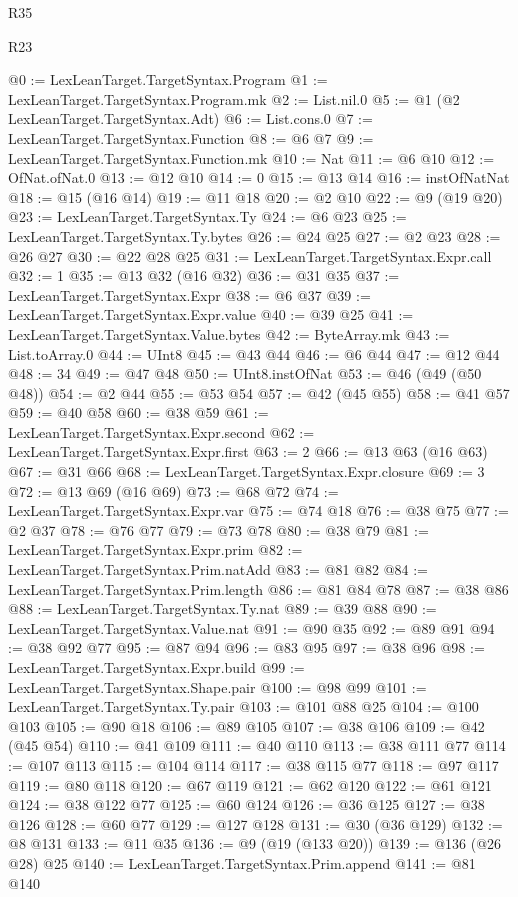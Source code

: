 \begin{lexlean}{R35}
\begin{lexlean}{R23}
\begin{coremodule}
{{{{{{{{{{{{{{{{{{{{{@0 := LexLeanTarget.TargetSyntax.Program
@1 := LexLeanTarget.TargetSyntax.Program.mk
@2 := List.nil.{0}
@5 := @1 (@2 LexLeanTarget.TargetSyntax.Adt)
@6 := List.cons.{0}
@7 := LexLeanTarget.TargetSyntax.Function
@8 := @6 @7
@9 := LexLeanTarget.TargetSyntax.Function.mk
@10 := Nat
@11 := @6 @10
@12 := OfNat.ofNat.{0}
@13 := @12 @10
@14 := 0
@15 := @13 @14
@16 := instOfNatNat
@18 := @15 (@16 @14)
@19 := @11 @18
@20 := @2 @10
@22 := @9 (@19 @20)
@23 := LexLeanTarget.TargetSyntax.Ty
@24 := @6 @23
@25 := LexLeanTarget.TargetSyntax.Ty.bytes
@26 := @24 @25
@27 := @2 @23
@28 := @26 @27
@30 := @22 @28 @25
@31 := LexLeanTarget.TargetSyntax.Expr.call
@32 := 1
@35 := @13 @32 (@16 @32)
@36 := @31 @35
@37 := LexLeanTarget.TargetSyntax.Expr
@38 := @6 @37
@39 := LexLeanTarget.TargetSyntax.Expr.value
@40 := @39 @25
@41 := LexLeanTarget.TargetSyntax.Value.bytes
@42 := ByteArray.mk
@43 := List.toArray.{0}
@44 := UInt8
@45 := @43 @44
@46 := @6 @44
@47 := @12 @44
@48 := 34
@49 := @47 @48
@50 := UInt8.instOfNat
@53 := @46 (@49 (@50 @48))
@54 := @2 @44
@55 := @53 @54
@57 := @42 (@45 @55)
@58 := @41 @57
@59 := @40 @58
@60 := @38 @59
@61 := LexLeanTarget.TargetSyntax.Expr.second
@62 := LexLeanTarget.TargetSyntax.Expr.first
@63 := 2
@66 := @13 @63 (@16 @63)
@67 := @31 @66
@68 := LexLeanTarget.TargetSyntax.Expr.closure
@69 := 3
@72 := @13 @69 (@16 @69)
@73 := @68 @72
@74 := LexLeanTarget.TargetSyntax.Expr.var
@75 := @74 @18
@76 := @38 @75
@77 := @2 @37
@78 := @76 @77
@79 := @73 @78
@80 := @38 @79
@81 := LexLeanTarget.TargetSyntax.Expr.prim
@82 := LexLeanTarget.TargetSyntax.Prim.natAdd
@83 := @81 @82
@84 := LexLeanTarget.TargetSyntax.Prim.length
@86 := @81 @84 @78
@87 := @38 @86
@88 := LexLeanTarget.TargetSyntax.Ty.nat
@89 := @39 @88
@90 := LexLeanTarget.TargetSyntax.Value.nat
@91 := @90 @35
@92 := @89 @91
@94 := @38 @92 @77
@95 := @87 @94
@96 := @83 @95
@97 := @38 @96
@98 := LexLeanTarget.TargetSyntax.Expr.build
@99 := LexLeanTarget.TargetSyntax.Shape.pair
@100 := @98 @99
@101 := LexLeanTarget.TargetSyntax.Ty.pair
@103 := @101 @88 @25
@104 := @100 @103
@105 := @90 @18
@106 := @89 @105
@107 := @38 @106
@109 := @42 (@45 @54)
@110 := @41 @109
@111 := @40 @110
@113 := @38 @111 @77
@114 := @107 @113
@115 := @104 @114
@117 := @38 @115 @77
@118 := @97 @117
@119 := @80 @118
@120 := @67 @119
@121 := @62 @120
@122 := @61 @121
@124 := @38 @122 @77
@125 := @60 @124
@126 := @36 @125
@127 := @38 @126
@128 := @60 @77
@129 := @127 @128
@131 := @30 (@36 @129)
@132 := @8 @131
@133 := @11 @35
@136 := @9 (@19 (@133 @20))
@139 := @136 (@26 @28) @25
@140 := LexLeanTarget.TargetSyntax.Prim.append
@141 := @81 @140
}}}}}}}}}}}}}}}}}}}}}
\end{coremodule}
\end{lexlean}
\end{lexlean}
